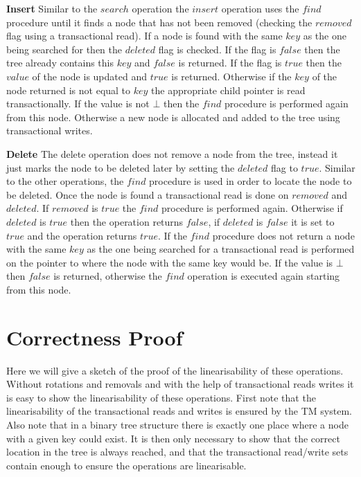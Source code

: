 \documentclass[10pt]{sigplanconf}
\begin{document}
{\bf Insert} Similar to the $search$ operation the $insert$ operation uses the $find$ procedure until it finds a node that has not been removed (checking the $removed$ flag using a transactional read).
If a node is found with the same $key$ as the one being searched for then the $deleted$ flag is checked.
If the flag is $false$ then the tree already contains this $key$ and $false$ is returned.
If the flag is $true$ then the $value$ of the node is updated and $true$ is returned.
Otherwise if the $key$ of the node returned is not equal to $key$ the appropriate child pointer is read transactionally.
If the value is not $\bot$ then the $find$ procedure is performed again from this node.
Otherwise a new node is allocated and added to the tree using transactional writes.

{\bf Delete} The delete operation does not remove a node from the tree, instead it just marks the node to be deleted later by setting the $deleted$ flag to $true$.
Similar to the other operations, the $find$ procedure is used in order to locate the node to be deleted.
Once the node is found a transactional read is done on $removed$ and $deleted$.
If $removed$ is $true$ the $find$ procedure is performed again.
Otherwise if $deleted$ is $true$ then the operation returns $false$, if $deleted$ is $false$ it is set to $true$ and the operation returns $true$.
If the $find$ procedure does not return a node with the same $key$ as the one being searched for a transactional read is performed on the pointer to where the node with the same key would be.
If the value is $\bot$ then $false$ is returned, otherwise the $find$ operation is executed again starting from this node.


\section{Correctness Proof}

Here we will give a sketch of the proof of the linearisability of these operations.
Without rotations and removals and with the help of transactional reads writes it is easy to show the linearisability of these operations.
First note that the linearisability of the transactional reads and writes is ensured by the TM system.
Also note that in a binary tree structure there is exactly one place where a node with a given key could exist.
It is then only necessary to show that the correct location in the tree is always reached, and that the transactional read/write sets contain enough to ensure the operations are linearisable.
\end{document}
